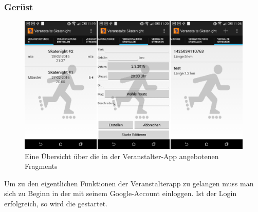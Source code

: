 \subsubsection{Gerüst}
\begin{figure}[htb]
\centering
\includegraphics[width=\textwidth]{graphics/veranstalterapp_events.png}
\caption{Eine Übersicht über die in der Veranstalter-App angebotenen Fragments}
\label{fig:veranstalterapp_fragments}
\end{figure}

Um zu den eigentlichen Funktionen der Veranstalterapp zu gelangen muss man sich zu Beginn in der  mit seinem Google-Account einloggen. Ist der Login erfolgreich, so wird die  gestartet.


